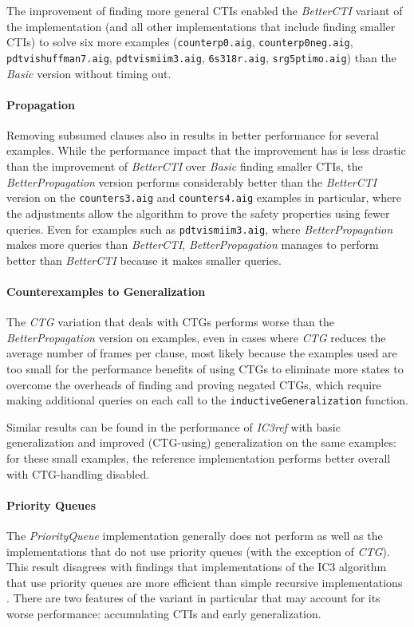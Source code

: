 \documentclass[12pt,a4paper,twoside,openright]{report}
\begin{document}
{{The improvement of finding more general CTIs enabled the \emph{BetterCTI} variant of the implementation
(and all other implementations that include finding smaller CTIs) to
solve six more examples (\verb,counterp0.aig,, \verb,counterp0neg.aig,, \verb,pdtvishuffman7.aig,, 
\verb,pdtvismiim3.aig,, \verb,6s318r.aig,, \verb,srg5ptimo.aig,) than the \emph{Basic} version without
timing out.}

\paragraph{Propagation}{
Removing subsumed clauses also in results in better performance for several examples.
While the performance impact that the improvement has is less drastic than the improvement of
\emph{BetterCTI} over \emph{Basic} finding smaller CTIs, the \emph{BetterPropagation} version performs
considerably better
than the \emph{BetterCTI} version on the \verb,counters3.aig, and \verb,counters4.aig, examples in
particular, where the adjustments allow the algorithm to prove the safety properties using fewer
queries. Even for examples such as \verb,pdtvismiim3.aig,, where \emph{BetterPropagation} makes more
queries than \emph{BetterCTI}, \emph{BetterPropagation} manages to perform better than \emph{BetterCTI}
because it makes smaller queries.}

\paragraph{Counterexamples to Generalization}{
The \emph{CTG} variation that deals with CTGs performs worse than the \emph{BetterPropagation} version
on examples, even in cases where \emph{CTG} reduces the average number of frames per clause,
most likely because the examples used are too small for the performance benefits of using CTGs to
eliminate more states to overcome the overheads of finding and proving negated CTGs, which require
making additional queries on each call to the \verb,inductiveGeneralization, function.

Similar results can be found
in the performance of \emph{IC3ref} with basic generalization and
improved (CTG-using) generalization on the same examples: for these small examples,
the reference implementation performs better overall with CTG-handling disabled.}

\paragraph{Priority Queues}{
The \emph{PriorityQueue} implementation generally does not perform as well as the
implementations that do not use priority queues (with the exception of \emph{CTG}).
This result disagrees with findings that implementations of the IC3 algorithm that
use priority queues are more efficient than simple recursive implementations
\cite{een11,griggio14}.
There are
two features of the variant in particular that may account for its worse performance: accumulating
CTIs and early generalization.

}}
\end{document}
